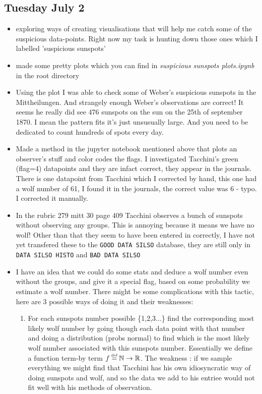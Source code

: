 \documentclass[12pt]{article}
\newcommand{\N}{\mathbb{N}}
\newcommand{\R}{\mathbb{R}}
\newcommand\defeq{\mathrel{\stackrel{\makebox[0pt]{\mbox{\normalfont\tiny def}}}{=}}}
\begin{document}
\subsection{Tuesday July 2}
\begin{itemize}
    \item exploring ways of creating visualisations that will help me catch some of the suspicious data-points. Right now my task is hunting down those ones which I labelled 'suspicious sunspots'
    \item made some pretty plots which you can find in \textit{suspicious sunspots plots.ipynb} in the root directory
    \item Using the plot I was able to check some of Weber's suspicious sunspots in the Mittheilungen. And strangely enough Weber's observations are correct! It seems he really did see 476 sunspots on the sun on the 25th of september 1870. I mean the pattern fits it's just unsusually large. And you need to be dedicated to count hundreds of spots every day.
    \item Made a method in the jupyter notebook mentioned above that plots an observer's stuff and color codes the flags. I investigated Tacchini's green (flag=4) datapoints and they are infact correct, they appear in the journals. There is one datapoint from Tacchini which I corrected by hand, this one had a wolf number of 61, I found it in the journals, the correct value was 6 - typo. I corrected it manually.
    \item In the rubric 279 mitt 30 page 409 Tacchini observes a bunch of sunspots without observing any groups. This is annoying because it means we have no wolf! Other than that they seem to have been entered in correctly, I have not yet transfered these to the \texttt{GOOD DATA SILSO} database, they are still only in \texttt{DATA SILSO HISTO} and \texttt{BAD DATA SILSO}
    \item I have an idea that we could do some stats and deduce a wolf number even without the groups, and give it a special flag, based on some probability we estimate a wolf number. There might be some complications with this tactic, here are 3 possible ways of doing it and their weaknesses:
    \begin{enumerate}
        \item For each sunspots number possible \{1,2,3...\} find the corresponding most likely wolf number by going though each data point with that number and doing a distribution (probs normal) to find which is the most likely wolf number associated with this sunspots number. Essentially we define a function term-by term $f \defeq{} \N \to \R$. The weakness : if we sample everything we might find that Tacchini has his own idiosyncratic way of doing sunspots and wolf, and so the data we add to his entriee would not fit well with his methods of observation.

\end{enumerate}
\end{itemize}
\end{document}
